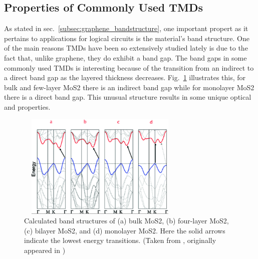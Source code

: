 \subsection{Properties of Commonly Used \acp{TMD}}\label{subsec:tmd_properties}
\noindent As stated in sec.~\ref{subsec:graphene_bandstructure}, one important propert as it pertains to applications for logical circuits is the material's band structure. One of the main reasons \acp{TMD} have been so extensively studied lately is due to the fact that, unlike graphene, they do exhibit a band gap. The band gaps in some commonly used \acp{TMD} is interesting because of the transition from an indirect to a direct band gap as the layered thickness decreases. Fig.~\ref{fig:mos2_bandstructure} illustrates this, for bulk and few-layer \acs{MoS2} there is an indirect band gap while for monolayer \acs{MoS2} there is a direct band gap. This unusual structure results in some unique optical and properties.
\begin{figure}[ht]
	\centering
	\includegraphics[height=5cm,width=8cm]{figs/intro/mos2_bandstructure}
	\caption[Band structures of \acs{MoS2}]{Calculated band structures of (a) bulk \acs{MoS2}, (b) four-layer \acs{MoS2}, (c) bilayer \acs{MoS2}, and (d) monolayer \acs{MoS2}. Here the solid arrows indicate the lowest energy transitions. (Taken from \cite{Lee_Nanoscale2014}, originally appeared in \cite{Splendiani_Nanolett2010})}
	\label{fig:mos2_bandstructure}
\end{figure}
 
